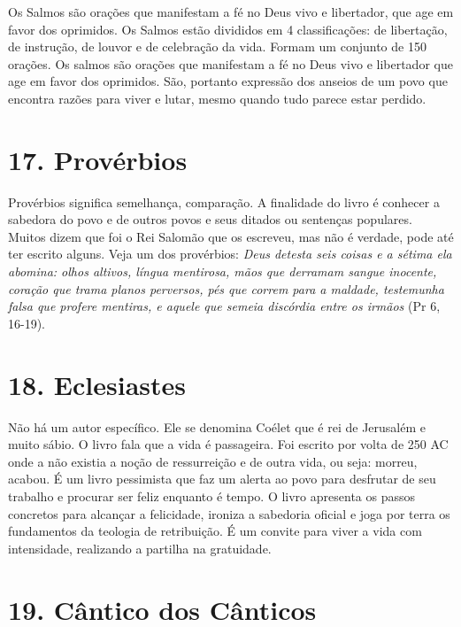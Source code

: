 \documentclass[
]{book}
\begin{document}
Os Salmos são orações que manifestam a fé no Deus vivo e libertador, que age em favor dos oprimidos. Os Salmos estão divididos em 4 classificações: de libertação, de instrução, de louvor e de celebração da vida. Formam um conjunto de 150 orações. Os salmos são orações que manifestam a fé no Deus vivo e libertador que age em favor dos oprimidos. São, portanto expressão dos anseios de um povo que encontra razões para viver e lutar, mesmo quando tudo parece estar perdido.

\hypertarget{provuxe9rbios}{%
\section*{17. Provérbios}\label{provuxe9rbios}}

Provérbios significa semelhança, comparação. A finalidade do livro é conhecer a sabedora do povo e de outros povos e seus ditados ou sentenças populares. Muitos dizem que foi o Rei Salomão que os escreveu, mas não é verdade, pode até ter escrito alguns. Veja um dos provérbios: \emph{Deus detesta seis coisas e a sétima ela abomina: olhos altivos, língua mentirosa, mãos que derramam sangue inocente, coração que trama planos perversos, pés que correm para a maldade, testemunha falsa que profere mentiras, e aquele que semeia discórdia entre os irmãos} (Pr 6, 16-19).

\hypertarget{eclesiastes}{%
\section*{18. Eclesiastes}\label{eclesiastes}}

Não há um autor específico. Ele se denomina Coélet que é rei de Jerusalém e muito sábio. O livro fala que a vida é passageira. Foi escrito por volta de 250 AC onde a não existia a noção de ressurreição e de outra vida, ou seja: morreu, acabou. É um livro pessimista que faz um alerta ao povo para desfrutar de seu trabalho e procurar ser feliz enquanto é tempo. O livro apresenta os passos concretos para alcançar a felicidade, ironiza a sabedoria oficial e joga por terra os fundamentos da teologia de retribuição. É um convite para viver a vida com intensidade, realizando a partilha na gratuidade.

\hypertarget{cuxe2ntico-dos-cuxe2nticos}{%
\section*{19. Cântico dos Cânticos}\label{cuxe2ntico-dos-cuxe2nticos}}
\end{document}
